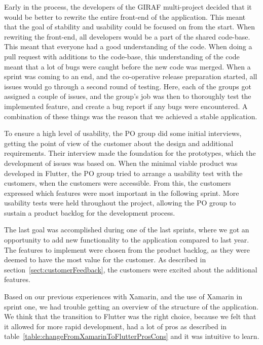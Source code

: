Early in the process, the developers of the GIRAF multi-project decided that it would be better to rewrite the entire front-end of the application. This meant that the goal of stability and usability could be focused on from the start.
When rewriting the front-end, all developers would be a part of the shared code-base. This meant that everyone had a good understanding of the code. When doing a pull request with additions to the code-base, this understanding of the code meant that a lot of bugs were caught before the new code was merged.
When a sprint was coming to an end, and the co-operative release preparation started, all issues would go through a second round of testing. Here, each of the groups got assigned a couple of issues, and the group's job was then to thoroughly test the implemented feature, and create a bug report if any bugs were encountered.
A combination of these things was the reason that we achieved a stable application.

To ensure a high level of usability, the PO group did some initial interviews, getting the point of view of the customer about the design and additional requirements. Their interview made the foundation for the prototypes, which the development of issues was based on. When the minimal viable product was developed in Flutter, the PO group tried to arrange a usability test with the customers, when the customers were accessible. From this, the customers expressed which features were most important in the following sprint. More usability tests were held throughout the project, allowing the PO group to sustain a product backlog for the development process. 

The last goal was accomplished during one of the last sprints, where we got an opportunity to add new functionality to the application compared to last year. The features to implement were chosen from the product backlog, as they were deemed to have the most value for the customer. As described in section~\ref{sect:customerFeedback}, the customers were excited about the additional features.

Based on our previous experiences with Xamarin, and the use of Xamarin in sprint one, we had trouble getting an overview of the structure of the application. We think that the transition to Flutter was the right choice, because we felt that it allowed for more rapid development, had a lot of pros as described in table~\ref{table:changeFromXamarinToFlutterProsCons} and it was intuitive to learn. 

